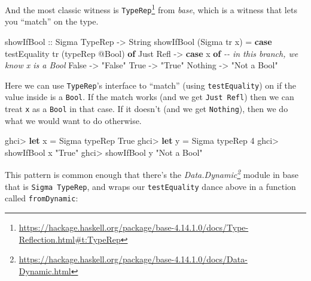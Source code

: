 \documentclass[]{article}
\newenvironment{Shaded}{}{}
\newcommand{\CommentTok}[1]{\textcolor[rgb]{0.38,0.63,0.69}{\textit{#1}}}
\newcommand{\DataTypeTok}[1]{\textcolor[rgb]{0.56,0.13,0.00}{#1}}
\newcommand{\DecValTok}[1]{\textcolor[rgb]{0.25,0.63,0.44}{#1}}
\newcommand{\KeywordTok}[1]{\textcolor[rgb]{0.00,0.44,0.13}{\textbf{#1}}}
\newcommand{\NormalTok}[1]{#1}
\newcommand{\OperatorTok}[1]{\textcolor[rgb]{0.40,0.40,0.40}{#1}}
\newcommand{\OtherTok}[1]{\textcolor[rgb]{0.00,0.44,0.13}{#1}}
\newcommand{\StringTok}[1]{\textcolor[rgb]{0.25,0.44,0.63}{#1}}
\renewcommand{\href}[2]{#2\footnote{\url{#1}}}
\begin{document}
And the most classic witness is
\href{https://hackage.haskell.org/package/base-4.14.1.0/docs/Type-Reflection.html\#t:TypeRep}{\texttt{TypeRep}}
from \emph{base}, which is a witness that lets you ``match'' on the type.

\begin{Shaded}
\begin{Highlighting}[]
\OtherTok{showIfBool ::} \DataTypeTok{Sigma} \DataTypeTok{TypeRep} \OtherTok{{-}\textgreater{}} \DataTypeTok{String}
\NormalTok{showIfBool (}\DataTypeTok{Sigma}\NormalTok{ tr x) }\OtherTok{=} \KeywordTok{case}\NormalTok{ testEquality tr (typeRep }\OperatorTok{@}\DataTypeTok{Bool}\NormalTok{) }\KeywordTok{of}
    \DataTypeTok{Just} \DataTypeTok{Refl} \OtherTok{{-}\textgreater{}} \KeywordTok{case}\NormalTok{ x }\KeywordTok{of}      \CommentTok{{-}{-} in this branch, we know x is a Bool}
      \DataTypeTok{False} \OtherTok{{-}\textgreater{}} \StringTok{"False"}
      \DataTypeTok{True}  \OtherTok{{-}\textgreater{}} \StringTok{"True"}
    \DataTypeTok{Nothing} \OtherTok{{-}\textgreater{}} \StringTok{"Not a Bool"}
\end{Highlighting}
\end{Shaded}

Here we can use \texttt{TypeRep}'s interface to ``match'' (using
\texttt{testEquality}) on if the value inside is a \texttt{Bool}. If the match
works (and we get \texttt{Just\ Refl}) then we can treat \texttt{x} as a
\texttt{Bool} in that case. If it doesn't (and we get \texttt{Nothing}), then we
do what we would want to do otherwise.

\begin{Shaded}
\begin{Highlighting}[]
\NormalTok{ghci}\OperatorTok{\textgreater{}} \KeywordTok{let}\NormalTok{ x }\OtherTok{=} \DataTypeTok{Sigma}\NormalTok{ typeRep }\DataTypeTok{True}
\NormalTok{ghci}\OperatorTok{\textgreater{}} \KeywordTok{let}\NormalTok{ y }\OtherTok{=} \DataTypeTok{Sigma}\NormalTok{ typeRep }\DecValTok{4}
\NormalTok{ghci}\OperatorTok{\textgreater{}}\NormalTok{ showIfBool x}
\StringTok{"True"}
\NormalTok{ghci}\OperatorTok{\textgreater{}}\NormalTok{ showIfBool y}
\StringTok{"Not a Bool"}
\end{Highlighting}
\end{Shaded}

This pattern is common enough that there's the
\emph{\href{https://hackage.haskell.org/package/base-4.14.1.0/docs/Data-Dynamic.html}{Data.Dynamic}}
module in base that is \texttt{Sigma\ TypeRep}, and wraps our
\texttt{testEquality} dance above in a function called \texttt{fromDynamic}:
\end{document}
